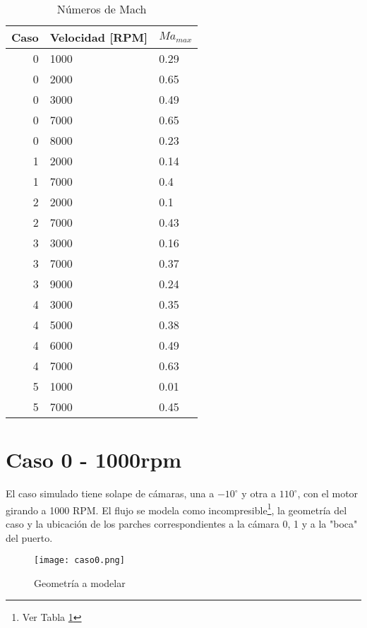\begin{table}
    \centering
    \begin{tabular}{rll}\toprule
        Caso & Velocidad [RPM] & $Ma_{max}$ \\ \midrule
        0 & 1000 & 0.29 \\
        0 & 2000 & 0.65 \\
        0 & 3000 & 0.49 \\
        0 & 7000 & 0.65 \\
        0 & 8000 & 0.23 \\
        1 & 2000 & 0.14 \\
        1 & 7000 & 0.4 \\
        2 & 2000 & 0.1 \\
        2 & 7000 & 0.43 \\
        3 & 3000 & 0.16 \\
        3 & 7000 & 0.37 \\
        3 & 9000 & 0.24 \\
        4 & 3000 & 0.35 \\
        4 & 5000 & 0.38 \\
        4 & 6000 & 0.49 \\
        4 & 7000 & 0.63 \\
        5 & 1000 & 0.01 \\
        5 & 7000 & 0.45 \\ \bottomrule
    \end{tabular}
    \caption{Números de Mach}
    \label{tab:mach}
\end{table}

\section{Caso 0 - 1000rpm}

El caso simulado tiene solape de cámaras, una a $-10^{\circ}$ y otra a
$110^{\circ}$, con el motor girando a 1000 RPM.
%
El flujo se modela como incompresible\footnote{Ver Tabla \ref{tab:mach}}, la
geometría del caso y la ubicación de los parches correspondientes a la cámara
0, 1 y a la "boca" del puerto.

\begin{figure}
    \centering
    \texttt{[image: caso0.png]}
    \caption{Geometría a modelar}
    \label{fig:caso0}
\end{figure}


